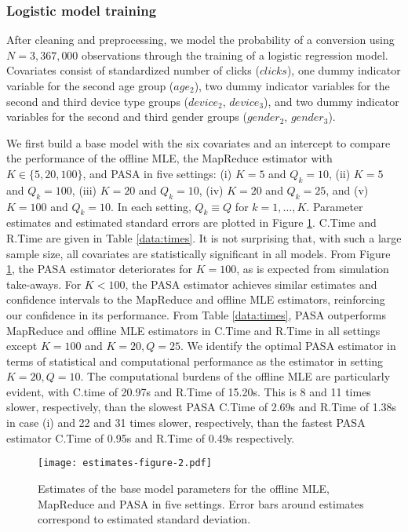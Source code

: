\documentclass[12pt]{article}
\begin{document}
\subsubsection{Logistic model training}
After cleaning and preprocessing, we model the probability of a conversion using $N=3,367,000$ observations through the training of a logistic regression model. Covariates consist of standardized number of clicks ($clicks$), one dummy indicator variable for the second age group ($age_2$), two dummy indicator variables for the second and third device type groups ($device_2$, $device_3$), and two dummy indicator variables for the second and third gender groups ($gender_2$, $gender_3$).

We first build a base model with the six covariates and an intercept to compare the performance of the offline MLE, the MapReduce estimator with $K\in \{5, 20, 100\}$, and PASA in five settings: (i) $K=5$ and $Q_k=10$, (ii) $K=5$ and $Q_k=100$, (iii) $K=20$ and $Q_k=10$, (iv) $K=20$ and $Q_k=25$, and (v) $K=100$ and $Q_k=10$. In each setting, $Q_k\equiv Q$ for $k=1, \ldots, K$. Parameter estimates and estimated standard errors are plotted in Figure \ref{data:estimates}. C.Time and R.Time are given in Table \ref{data:times}. It is not surprising that, with such a large sample size, all covariates are statistically significant in all models. From Figure \ref{data:estimates}, the PASA estimator deteriorates for $K=100$, as is expected from simulation take-aways. For $K<100$, the PASA estimator achieves similar estimates and confidence intervals to the MapReduce and offline MLE estimators, reinforcing our confidence in its performance. From Table \ref{data:times}, PASA outperforms MapReduce and offline MLE estimators in C.Time and R.Time in all settings except $K=100$ and $K=20,Q=25$. We identify the optimal PASA estimator in terms of statistical and computational performance as the estimator in setting $K=20,Q=10$. The computational burdens of the offline MLE are particularly evident, with C.time of 20.97s and R.Time of 15.20s. This is 8 and 11 times slower, respectively, than the slowest PASA C.Time of 2.69s and R.Time of 1.38s in case (i) and 22 and 31 times slower, respectively, than the fastest PASA estimator C.Time of 0.95s and R.Time of 0.49s respectively.
\begin{figure}[ht]
\centering
\texttt{[image: estimates-figure-2.pdf]}
\caption{Estimates of the base model parameters for the offline MLE, MapReduce and PASA in five settings. Error bars around estimates correspond to estimated standard deviation. \label{data:estimates}}
\end{figure}
\end{document}

